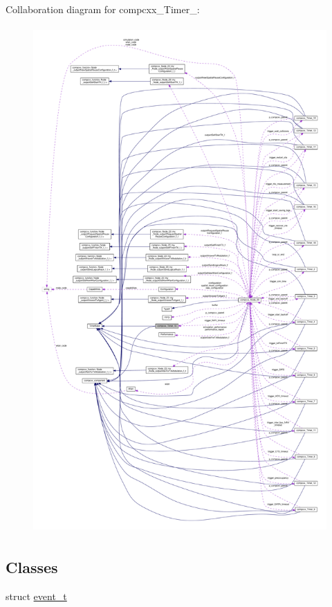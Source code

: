 Collaboration diagram for compcxx\+\_\+\+Timer\+\_\+:\nopagebreak
\begin{figure}[H]
\begin{center}
\leavevmode
\includegraphics[height=550pt]{classcompcxx__Timer__10__coll__graph}
\end{center}
\end{figure}
\subsection*{Classes}
\begin{DoxyCompactItemize}
\item 
struct \hyperlink{structcompcxx__Timer__10_1_1event__t}{event\+\_\+t}
\end{DoxyCompactItemize}
